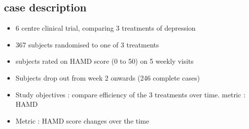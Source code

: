 \documentclass{beamer}
\begin{document}
\subsection{case description}
\begin{frame}
	\begin{itemize}
		\item<1->6 centre clinical trial, comparing 3 treatments of depression
		\item<2->367 subjects randomised to one of 3 treatments
		\item<3->subjects rated on HAMD score (0 to 50)  on 5 weekly visits
		\item<4->Subjects drop out from week 2 onwards (246 complete cases)
		\item<5->Study objectives : compare efficiency of the 3 treatments over time. metric : HAMD
	        \item<6-> Metric : HAMD score changes over the time
	\end{itemize}
\end{frame}

\begin{frame}
\end{frame}
\end{document}
